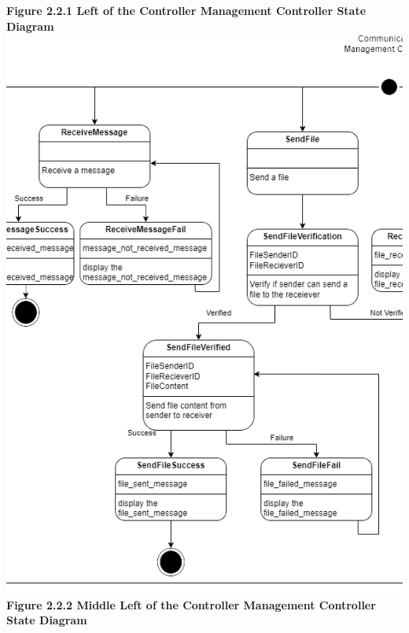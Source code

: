 \documentclass[]{article}
\begin{document}
\begin{center}
	\textbf{Figure 2.2.1 Left of the Controller Management Controller State Diagram}
	\includegraphics{../images/ControllerStateDiagrams/CMC2.png}\\
	\textbf{Figure 2.2.2 Middle Left of the Controller Management Controller State Diagram}

\end{center}
\end{document}
